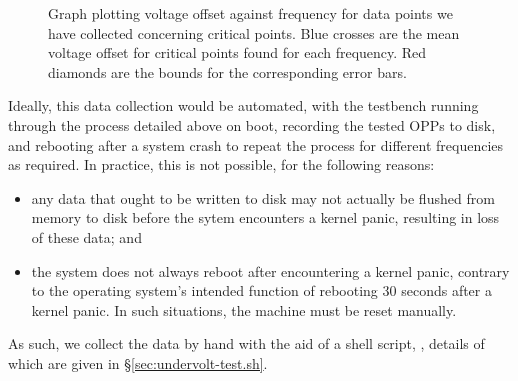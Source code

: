 \begin{figure}[!htb]
    \caption{
        \label{fig:critical-points-graph}
        Graph plotting voltage offset against frequency for data points we have
        collected concerning critical points. Blue crosses are the mean voltage
        offset for critical points found for each frequency. Red diamonds are
        the bounds for the corresponding error bars.
    }
\end{figure}

Ideally, this data collection would be automated, with the testbench running
through the process detailed above on boot, recording the tested OPPs to disk,
and rebooting after a system crash to repeat the process for different
frequencies as required. In practice, this is not possible, for the following
reasons:
\begin{itemize}
    \item any data that ought to be written to disk may not actually be flushed
        from memory to disk before the sytem encounters a kernel panic, 
        resulting in loss of these data; and
    \item the system does not always reboot after encountering a kernel panic,
        contrary to the operating system's intended function of rebooting 30
        seconds after a kernel panic. In such situations, the machine must be
        reset manually.
\end{itemize}

As such, we collect the data by hand with the aid of a shell script,
, details of which are given in
§\ref{sec:undervolt-test.sh}.

